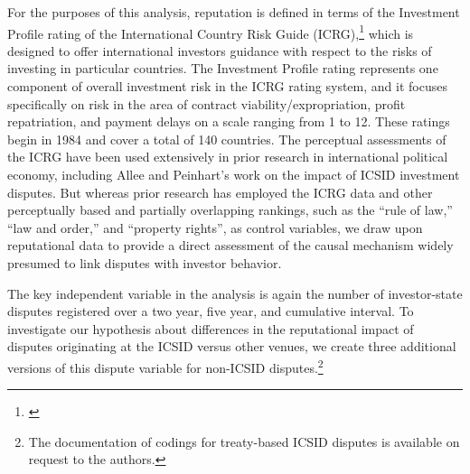 \documentclass[12pt,onesided]{amsart}
\begin{document}
For the purposes of this analysis, reputation is defined in terms of the Investment Profile rating of the International Country Risk Guide (ICRG),\footnote{\citet{prs:2013}} which is designed to offer international investors guidance with respect to the risks of investing in particular countries. The Investment Profile rating represents one component of overall investment risk in the ICRG rating system, and it focuses specifically on risk in the area of contract viability/expropriation, profit repatriation, and payment delays on a scale ranging from 1 to 12. These ratings begin in 1984 and cover a total of 140 countries. The perceptual assessments of the ICRG have been used extensively in prior research in international political economy, including Allee and Peinhart's work on the impact of ICSID investment disputes. But whereas prior research has employed the ICRG data and other perceptually based and partially overlapping rankings, such as the ``rule of law,'' ``law and order,'' and ``property rights'', as control variables, we draw upon reputational data to provide a direct assessment of the causal mechanism widely presumed to link disputes with investor behavior.

The key independent variable in the analysis is again the number of investor-state disputes registered over a two year, five year, and cumulative interval. To investigate our hypothesis about differences in the reputational impact of disputes originating at the ICSID versus other venues, we create three additional versions of this dispute variable for non-ICSID disputes.\footnote{The documentation of codings for treaty-based ICSID disputes is available on request to the authors.} 
\end{document}
